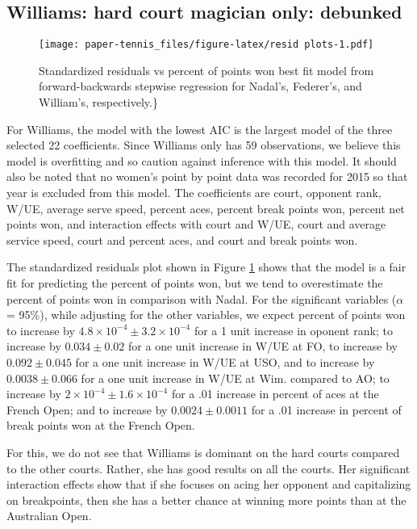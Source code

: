 \documentclass[]{article}
\begin{document}
\hypertarget{williams-hard-court-magician-only-debunked}{%
\subsection{Williams: hard court magician only:
debunked}\label{williams-hard-court-magician-only-debunked}}

\begin{figure}
\centering
\texttt{[image: paper-tennis\_files/figure-latex/resid plots-1.pdf]}
\caption{\label{fig:individ-resids}Standardized residuals vs percent of
points won best fit model from forward-backwards stepwise regression for
Nadal's, Federer's, and William's, respectively.\}}
\end{figure}

For Williams, the model with the lowest AIC is the largest model of the
three selected 22 coefficients. Since Williams only has 59 observations,
we believe this model is overfitting and so caution against inference
with this model. It should also be noted that no women's point by point
data was recorded for 2015 so that year is excluded from this model. The
coefficients are court, opponent rank, W/UE, average serve speed,
percent aces, percent break points won, percent net points won, and
interaction effects with court and W/UE, court and average service
speed, court and percent aces, and court and break points won.

The standardized residuals plot shown in Figure \ref{fig:individ-resids}
shows that the model is a fair fit for predicting the percent of points
won, but we tend to overestimate the percent of points won in comparison
with Nadal. For the significant variables (\(\alpha\) = 95\(\%\)), while
adjusting for the other variables, we expect percent of points won to
increase by \(4.8\times 10^{-4} \pm 3.2\times 10^{-4}\) for a 1 unit
increase in oponent rank; to increase by \(0.034 \pm 0.02\) for a one
unit increase in W/UE at FO, to increase by \(0.092 \pm 0.045\) for a
one unit increase in W/UE at USO, and to increase by \(0.0038\pm 0.066\)
for a one unit increase in W/UE at Wim. compared to AO; to increase by
\(2\times 10^{-4}\pm 1.6\times 10^{-4}\) for a .01 increase in percent
of aces at the French Open; and to increase by \(0.0024 \pm 0.0011\) for
a .01 increase in percent of break points won at the French Open.

For this, we do not see that Williams is dominant on the hard courts
compared to the other courts. Rather, she has good results on all the
courts. Her significant interaction effects show that if she focuses on
acing her opponent and capitalizing on breakpoints, then she has a
better chance at winning more points than at the Australian Open.
\end{document}
